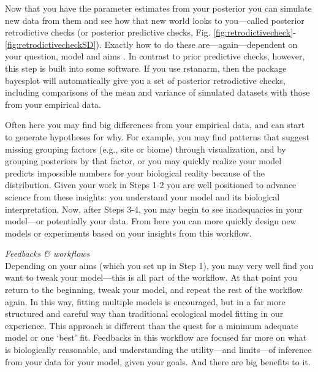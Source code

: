 \documentclass[11pt]{article}
\begin{document}
Now that you have the parameter estimates from your posterior you can simulate new data from them and see how that new world looks to you---called posterior retrodictive checks (or posterior predictive checks, Fig. \ref{fig:retrodictivecheck}-\ref{fig:retrodictivecheckSD}). Exactly how to do these are---again---dependent on your question, model and aims \citep[but there is lots written on this,][]{held2010,gelman200ppc,conn2018}. In contrast to prior predictive checks, however, this step is built into some software. If you use \textsf{rstanarm}, then the package \textsf{bayesplot} will automatically give you a set of posterior retrodictive checks, including comparisons of the mean and variance of simulated datasets with those from your empirical data. 

Often here you may find big differences from your empirical data, and can start to generate hypotheses for why. For example, you may find patterns that suggest missing grouping factors (e.g., site or biome) through visualization, and by grouping posteriors by that factor, or you may quickly realize your model predicts impossible numbers for your biological reality because of the distribution. Given your work in Steps 1-2 you are well positioned to advance science from these insights: you understand your model and its biological interpretation. Now, after Steps 3-4, you may begin to see inadequacies in your model---or potentially your data. From here you can more quickly design new models or experiments based on your insights from this workflow. 

\emph{Feedbacks \& workflows}\\
Depending on your aims (which you set up in Step 1), you may very well find you want to tweak your model---this is all part of the workflow. At that point you return to the beginning, tweak your model, and repeat the rest of the workflow again. In this way, fitting multiple models is encouraged, but in a far more structured and careful way than traditional ecological model fitting in our experience. This approach is different than the quest for a minimum adequate model or one `best' fit. Feedbacks in this workflow are focused far more on what is biologically reasonable, and understanding the utility---and limits---of inference from your data for your model, given your goals.  And there are big benefits to it. 
\end{document}

